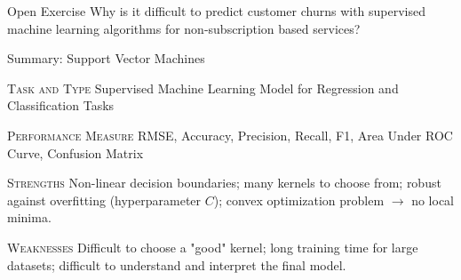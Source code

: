 \documentclass[document.tex]{subfiles}
\begin{document}
    \begin{frame}{Open Exercise }
        Why is it difficult to predict customer churns with supervised machine learning algorithms for non-subscription based services?
    \end{frame}

    
    \begin{frame}{Summary: Support Vector Machines}
        \begin{alertblock}{\textsc{Task and Type}}
            Supervised Machine Learning Model for Regression and Classification Tasks
        \end{alertblock}
        \begin{alertblock}{\textsc{Performance Measure}}
            RMSE, Accuracy, Precision, Recall, F1, Area Under ROC Curve, Confusion Matrix
        \end{alertblock}
        \begin{alertblock}{\textsc{Strengths}}
            Non-linear decision boundaries; many kernels to choose from; robust against overfitting (hyperparameter $C$); convex optimization problem $\rightarrow$ no local minima.
        \end{alertblock}
        \begin{alertblock}{\textsc{Weaknesses}}
            Difficult to choose a "good" kernel; long training time for large datasets; difficult to understand and interpret the final model.
        \end{alertblock}
    \end{frame}
\end{document}
